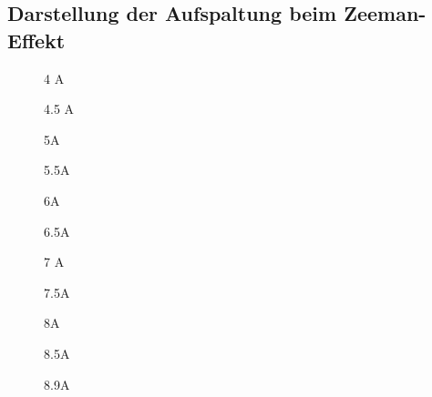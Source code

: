 \documentclass[11pt, a4paper]{article}
\begin{document}
\begin{appendix}
\section{Darstellung der Aufspaltung beim Zeeman-Effekt}


\begin{figure}[h]
	\centering
	
	\caption{4 A}
	\label{fig:gauss1}
\end{figure}

\begin{figure}[h]
	\centering
	
	\caption{4.5 A}
	\label{fig:gauss2}
\end{figure}

\begin{figure}[h]
	\centering
	
	\caption{5A}
	\label{fig:gauss3}
\end{figure}

\begin{figure}[h]
	\centering
	
	\caption{5.5A}
	\label{fig:gauss4}
\end{figure}

\begin{figure}[h]
	\centering
	
	\caption{6A}
	\label{fig:gauss5}
\end{figure}

\begin{figure}[h]
	\centering
	
	\caption{6.5A}
	\label{fig:gauss6}
\end{figure}

\begin{figure}[h]
	\centering
	
	\caption{7 A}
	\label{fig:gauss7}
\end{figure}

\begin{figure}[h]
	\centering
	
	\caption{7.5A}
	\label{fig:gauss8}
\end{figure}

\begin{figure}[h]
	\centering
	
	\caption{8A}
	\label{fig:gauss9}
\end{figure}

\begin{figure}[h]
	\centering
	
	\caption{8.5A}
	\label{fig:gauss10}
\end{figure}

\begin{figure}[h]
	\centering
	
	\caption{8.9A}
	\label{fig:gauss11}
\end{figure}

\FloatBarrier


\end{appendix}
\end{document}
